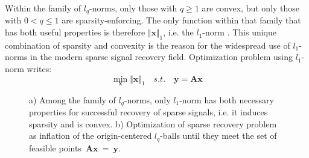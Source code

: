 \documentclass[journal]{IEEEtran}
\begin{document}
Within the family of $l_q$-norms, only those with $q\geq 1$ are convex, but only those with $0<q\leq 1$ are sparsity-enforcing. The only function within that family that has both useful properties is therefore $\Vert \boldsymbol{x}\Vert_1$, i.e. the $l_1$-norm \cite{Rish2015}. This unique combination of sparsity and convexity is the reason for the widespread use of $l_1$-norms in the modern sparse signal recovery field. Optimization problem using $l_1$-norm writes:
\begin{equation} \label{eq:l1_optimization}
	\min\limits_{\boldsymbol{x}}\Vert \boldsymbol{x}\Vert_1 \quad s.t. \quad \boldsymbol{y}=\boldsymbol{A} \boldsymbol{x}
\end{equation}
%
%
\begin{figure}
	\centering
	
	\caption{a) Among the family of $l_q$-norms, only $l_1$-norm has both necessary properties for successful recovery of sparse signals, i.e. it induces sparsity and is convex. b) Optimization of sparse recovery problem as inflation of the origin-centered $l_q$-balls until they meet the set of feasible points~$\boldsymbol{A}\boldsymbol{x}~=~\boldsymbol{y}$.~\cite{Rish2015}}
	\label{fig:lq_balls}
	
\end{figure}
\end{document}

